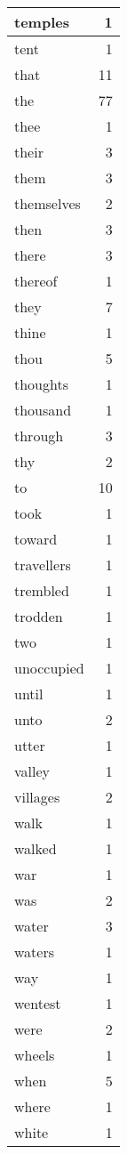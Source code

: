 \begin{center}
\begin{longtable}{l|r}
temples & 1\\ \hline 
tent & 1\\ \hline 
that & 11\\ \hline 
the & 77\\ \hline 
thee & 1\\ \hline 
their & 3\\ \hline 
them & 3\\ \hline 
themselves & 2\\ \hline 
then & 3\\ \hline 
there & 3\\ \hline 
thereof & 1\\ \hline 
they & 7\\ \hline 
thine & 1\\ \hline 
thou & 5\\ \hline 
thoughts & 1\\ \hline 
thousand & 1\\ \hline 
through & 3\\ \hline 
thy & 2\\ \hline 
to & 10\\ \hline 
took & 1\\ \hline 
toward & 1\\ \hline 
travellers & 1\\ \hline 
trembled & 1\\ \hline 
trodden & 1\\ \hline 
two & 1\\ \hline 
unoccupied & 1\\ \hline 
until & 1\\ \hline 
unto & 2\\ \hline 
utter & 1\\ \hline 
valley & 1\\ \hline 
villages & 2\\ \hline 
walk & 1\\ \hline 
walked & 1\\ \hline 
war & 1\\ \hline 
was & 2\\ \hline 
water & 3\\ \hline 
waters & 1\\ \hline 
way & 1\\ \hline 
wentest & 1\\ \hline 
were & 2\\ \hline 
wheels & 1\\ \hline 
when & 5\\ \hline 
where & 1\\ \hline 
white & 1\\ \hline 

\end{longtable}
\end{center}
